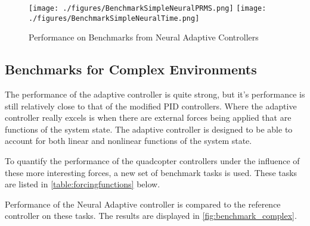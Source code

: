 \documentclass[letterpaper,12pt,titlepage,oneside,final]{book}
\begin{document}
\begin{figure}
\centering
\texttt{[image: ./figures/BenchmarkSimpleNeuralPRMS.png]} %
\texttt{[image: ./figures/BenchmarkSimpleNeuralTime.png]} %
\caption{Performance on Benchmarks from Neural Adaptive Controllers}
\label{fig:benchmark_simple_neural}
\end{figure}






\subsection{Benchmarks for Complex Environments}

The performance of the adaptive controller is quite strong, but it's performance is still relatively close to that of the modified PID controllers. 
Where the adaptive controller really excels is when there are external forces being applied that are functions of the system state. 
The adaptive controller is designed to be able to account for both linear and nonlinear functions of the system state.

To quantify the performance of the quadcopter controllers under the influence of these more interesting forces, a new set of benchmark tasks is used.
These tasks are listed in \autoref{table:forcingfunctions} below. %



Performance of the Neural Adaptive controller is compared to the reference controller on these tasks.
The results are displayed in \autoref{fig:benchmark_complex}. 
\end{document}
